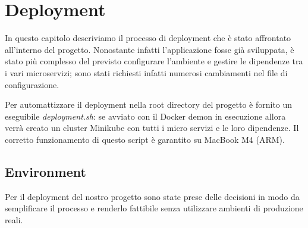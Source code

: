 \chapter{Deployment}
In questo capitolo descriviamo il processo di deployment che è stato affrontato all'interno del progetto. Nonostante infatti l'applicazione fosse già sviluppata, è stato più complesso del previsto configurare l'ambiente e gestire le dipendenze tra i vari microservizi; sono stati richiesti infatti numerosi cambiamenti nel file di configurazione.

\myskip

Per automattizzare il deployment nella root directory del progetto è fornito un eseguibile \textit{deployment.sh}: se avviato con il Docker demon in esecuzione allora verrà creato un cluster Minikube con tutti i micro servizi e le loro dipendenze. Il corretto funzionamento di questo script è garantito su MacBook M4 (ARM).

\section{Environment}
Per il deployment del nostro progetto sono state prese delle decisioni in modo da semplificare il processo e renderlo fattibile senza utilizzare ambienti di produzione reali.


